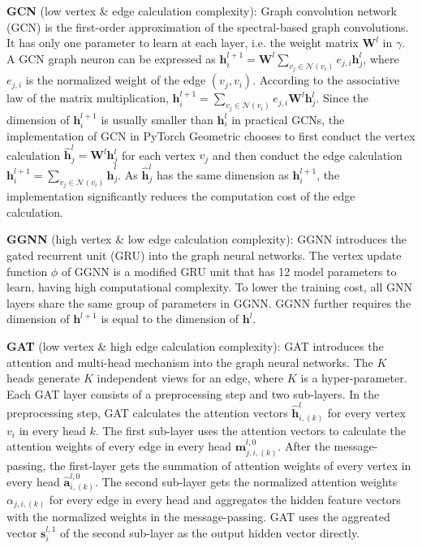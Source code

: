 \textbf{GCN} \cite{kipf2017_gcn} (low vertex \& edge calculation complexity): Graph convolution network (GCN) is the first-order approximation of the spectral-based graph convolutions.
It has only one parameter to learn at each layer, i.e. the weight matrix $\boldsymbol{W}^l$ in $\gamma$.
A GCN graph neuron can be expressed as $\boldsymbol{h}^{l+1}_i = \boldsymbol{W}^l\sum_{v_j \in \mathcal{N}(v_i)}{e_{j,i}\boldsymbol{h}^l_j}$, where $e_{j,i}$ is the normalized weight of the edge $(v_j, v_i)$.
According to the associative law of the matrix multiplication, $\boldsymbol{h}^{l+1}_i = \sum_{v_j \in \mathcal{N}(v_i)}{e_{j,i}\boldsymbol{W}^l\boldsymbol{h}^l_j}$.
Since the dimension of $\boldsymbol{h}^{l+1}_i$ is usually smaller than $\boldsymbol{h}^l_i$ in practical GCNs, the implementation of GCN in PyTorch Geometric chooses to first conduct the vertex calculation $\hat{\boldsymbol{h}}^l_j = \boldsymbol{W}^l\boldsymbol{h}^l_j$ for each vertex $v_j$ and then conduct the edge calculation $\boldsymbol{h}^{l+1}_i=\sum_{v_j\in\mathcal{N}(v_i)}{\hat{\boldsymbol{h}}^l_j}$.
As $\hat{\boldsymbol{h}}^l_j$ has the same dimension as $\boldsymbol{h}^{l+1}_i$, the implementation significantly reduces the  computation cost of the edge calculation.

\textbf{GGNN} (high vertex \& low edge calculation complexity):
GGNN introduces the gated recurrent unit (GRU) into the graph neural networks.
The vertex update function $\phi$ of GGNN is a modified GRU unit that has 12 model parameters to learn, having high computational complexity.
To lower the training cost, all GNN layers share the same group of parameters in GGNN.
GGNN further requires the dimension of $\boldsymbol{h}^{l+1}$ is equal to the dimension of $\boldsymbol{h}^l$.

\textbf{GAT} (low vertex \& high edge calculation complexity):
GAT introduces the attention and multi-head mechanism into the graph neural networks.
The $K$ heads generate $K$ independent views for an edge, where $K$ is a hyper-parameter.
Each GAT layer consists of a preprocessing step and two sub-layers.
In the preprocessing step, GAT calculates the attention vectors $\hat{\boldsymbol{h}}^{l}_{i,(k)}$ for every vertex $v_i$ in every head $k$.
The first sub-layer uses the attention vectors to calculate the attention weights of every edge in every head $\boldsymbol{m}^{l,0}_{j,i,(k)}$.
After the message-passing, the first-layer gets the summation of attention weights of every vertex in every head $\hat{\boldsymbol{a}}^{l,0}_{i,(k)}$.
The second sub-layer gets the normalized attention weights $\alpha_{j, i, (k)}$ for every edge in every head and aggregates the hidden feature vectors with the normalized weights in the message-passing. 
GAT uses the aggreated vector $\boldsymbol{s}^{l,1}_i$ of the second sub-layer as the output hidden vector directly.


